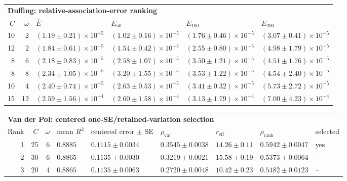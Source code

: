 \begin{tabular}{rrllll}
\toprule
\multicolumn{6}{l}{\textbf{Duffing: relative-association-error ranking}}\\
$C$ & $\omega$ & $\overline E$ & $E_{50}$ & $E_{100}$ & $E_{200}$ \\
\midrule
10 & 2 & $(1.19\pm0.21)\times10^{-5}$ & $(1.02\pm0.16)\times10^{-5}$ & $(1.76\pm0.46)\times10^{-5}$ & $(3.07\pm0.41)\times10^{-5}$ \\
12 & 2 & $(1.84\pm0.61)\times10^{-5}$ & $(1.54\pm0.42)\times10^{-5}$ & $(2.55\pm0.80)\times10^{-5}$ & $(4.98\pm1.79)\times10^{-5}$ \\
8 & 6 & $(2.18\pm0.83)\times10^{-5}$ & $(2.58\pm1.07)\times10^{-5}$ & $(3.50\pm1.21)\times10^{-5}$ & $(4.51\pm1.76)\times10^{-5}$ \\
8 & 8 & $(2.34\pm1.05)\times10^{-5}$ & $(3.20\pm1.55)\times10^{-5}$ & $(3.53\pm1.22)\times10^{-5}$ & $(4.54\pm2.40)\times10^{-5}$ \\
10 & 4 & $(2.40\pm0.74)\times10^{-5}$ & $(2.63\pm0.53)\times10^{-5}$ & $(3.41\pm0.32)\times10^{-5}$ & $(5.73\pm2.72)\times10^{-5}$ \\
15 & 12 & $(2.59\pm1.56)\times10^{-4}$ & $(2.60\pm1.58)\times10^{-4}$ & $(3.13\pm1.79)\times10^{-4}$ & $(7.00\pm4.23)\times10^{-4}$ \\
\bottomrule
\end{tabular}

\vspace{0.75em}

\begin{tabular}{rrrllllll}
\toprule
\multicolumn{9}{l}{\textbf{Van der Pol: centered one-SE/retained-variation selection}}\\
Rank & $C$ & $\omega$ & mean $R^2$ & centered error $\pm$ SE & $\rho_{\mathrm{var}}$ & $r_{\mathrm{eff}}$ & $\rho_{\mathrm{rank}}$ & selected \\
\midrule
1 & 25 & 6 & $0.8885$ & $0.1115\pm0.0034$ & $0.3545\pm0.0038$ & $14.26\pm0.11$ & $0.5942\pm0.0047$ & yes \\
2 & 30 & 6 & $0.8865$ & $0.1135\pm0.0030$ & $0.3219\pm0.0021$ & $15.58\pm0.19$ & $0.5373\pm0.0064$ & -- \\
3 & 20 & 4 & $0.8865$ & $0.1135\pm0.0063$ & $0.2720\pm0.0048$ & $10.42\pm0.23$ & $0.5482\pm0.0123$ & -- \\
\bottomrule
\end{tabular}
